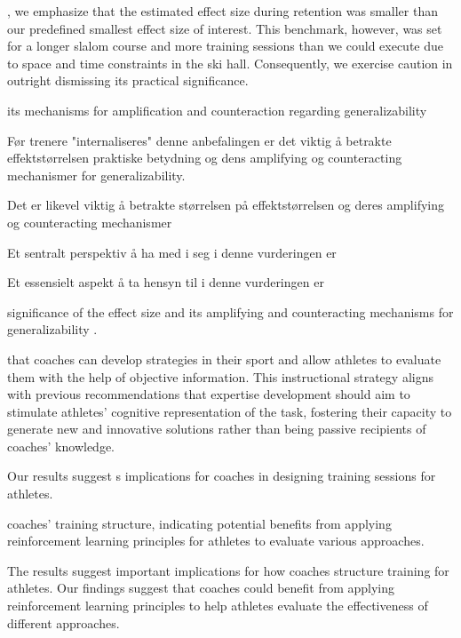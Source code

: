 \documentclass{article}
\begin{document}
, we emphasize that the estimated effect size during retention was smaller than our predefined smallest effect size of interest. This benchmark, however, was set for a longer slalom course and more training sessions than we could execute due to space and time constraints in the ski hall. Consequently, we exercise caution in outright dismissing its practical significance.



its mechanisms for amplification and counteraction regarding generalizability 

Før trenere "internaliseres" denne anbefalingen er det viktig å betrakte effektstørrelsen praktiske betydning og dens amplifying og counteracting mechanismer for generalizability.

Det er likevel viktig å betrakte størrelsen på effektstørrelsen og deres amplifying og counteracting mechanismer

Et sentralt perspektiv å ha med i seg i denne vurderingen er 

Et essensielt aspekt å ta hensyn til i denne vurderingen er 

significance of the effect size and its amplifying and counteracting mechanisms for generalizability \cite{anvari_not_2023}. 














that coaches can develop strategies in their sport and allow athletes to evaluate them with the help of objective information. This instructional strategy aligns with previous recommendations that expertise development should aim to stimulate athletes' cognitive representation of the task, fostering their capacity to generate new and innovative solutions rather than being passive recipients of coaches' knowledge.

Our results suggest s implications for coaches in designing training sessions for athletes. 

 


coaches' training structure, indicating potential benefits from applying reinforcement learning principles for athletes to evaluate various approaches. 

The results suggest important implications for how coaches structure training for athletes. Our findings suggest that coaches could benefit from applying reinforcement learning principles to help athletes evaluate the effectiveness of different approaches. 
\end{document}
